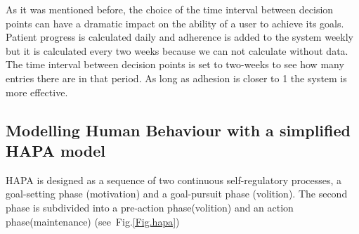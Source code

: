 \documentclass{llncs}
\begin{document}
As it was mentioned before, the choice of the time interval between decision points can have a dramatic impact on the ability of a user to achieve its goals. Patient progress is calculated daily and adherence is added to the system weekly but it is calculated every two weeks because we can not calculate without data. The time interval between decision points is set to two-weeks to see how many entries there are in that period. As long as adhesion is closer to 1 the system is more effective.

\subsection{Modelling Human Behaviour with a simplified HAPA model}

HAPA is designed as a sequence of two continuous self-regulatory processes, a goal-setting phase (motivation) and a goal-pursuit phase (volition). The second phase is subdivided into a pre-action phase(volition) and an action phase(maintenance) (see~Fig.\ref{Fig.hapa})
\end{document}
